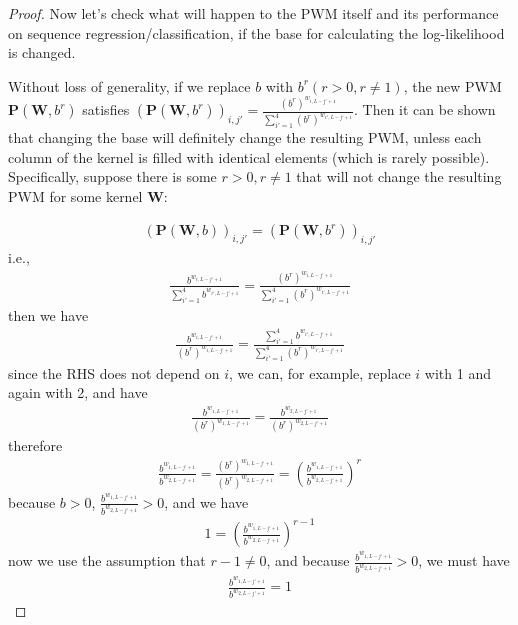 \documentclass[12pt]{article}
\newcommand{\matrixSymbol}[1]{\mathbf{#1}}
\begin{document}
\begin{proof}
Now let's check what will happen to the PWM itself and its performance on sequence regression/classification, if the base for calculating the log-likelihood is changed. 

Without loss of generality, if we replace $b$ with $b^{r} (r>0, r \neq 1)$, the new PWM $\matrixSymbol{P}(\matrixSymbol{W}, b^{r})$ satisfies $(\matrixSymbol{P}(\matrixSymbol{W}, b^{r}))_{i, j'} = \frac{(b^{r})^{w_{i, L-j'+1}}} {\sum_{i'=1}^{4}{(b^{r})^{w_{i', L-j'+1}}}}$. Then it can be shown that changing the base will definitely change the resulting PWM, unless each column of the kernel is filled with identical elements (which is rarely possible). Specifically, suppose there is some $r>0, r \neq 1$ that will not change the resulting PWM for some kernel $\matrixSymbol{W}$: 

\begin{align}
(\matrixSymbol{P}(\matrixSymbol{W}, b))_{i, j'} = (\matrixSymbol{P}(\matrixSymbol{W}, b^{r}))_{i, j'}
\end{align}
i.e., 
\begin{align}
\frac{b^{w_{i, L-j'+1}}} {\sum_{i'=1}^{4}{b^{w_{i', L-j'+1}}}} = \frac{(b^{r})^{w_{i, L-j'+1}}} {\sum_{i'=1}^{4}{(b^{r})^{w_{i', L-j'+1}}}}
\end{align}
then we have
\begin{align}
\frac{b^{w_{i, L-j'+1}}} {(b^{r})^{w_{i, L-j'+1}}} = \frac{\sum_{i'=1}^{4}{b^{w_{i', L-j'+1}}}} {\sum_{i'=1}^{4}{(b^{r})^{w_{i', L-j'+1}}}}
\end{align}
since the RHS does not depend on $i$, we can, for example,  replace $i$ with 1 and again with 2, and have
\begin{align}
\frac{b^{w_{1, L-j'+1}}} {(b^{r})^{w_{1, L-j'+1}}} = \frac{b^{w_{2, L-j'+1}}} {(b^{r})^{w_{2, L-j'+1}}}
\end{align}
therefore
\begin{align}
\frac{b^{w_{1, L-j'+1}}} {b^{w_{2, L-j'+1}}} = \frac{(b^{r})^{w_{1, L-j'+1}}} {(b^{r})^{w_{2, L-j'+1}}} = \left( \frac{b^{w_{1, L-j'+1}}} {b^{w_{2, L-j'+1}}} \right) ^r
\end{align}
because $b > 0$, $\frac{b^{w_{1, L-j'+1}}} {b^{w_{2, L-j'+1}}} > 0 $, and we have
\begin{align}
1 = \left( \frac{b^{w_{1, L-j'+1}}} {b^{w_{2, L-j'+1}}} \right) ^{r-1}
\end{align}
now we use the assumption that $r-1 \neq 0$, and because $\frac{b^{w_{1, L-j'+1}}} {b^{w_{2, L-j'+1}}} > 0$, we must have 
\begin{align}
\frac{b^{w_{1, L-j'+1}}} {b^{w_{2, L-j'+1}}} = 1

\end{align}
\end{proof}
\end{document}
